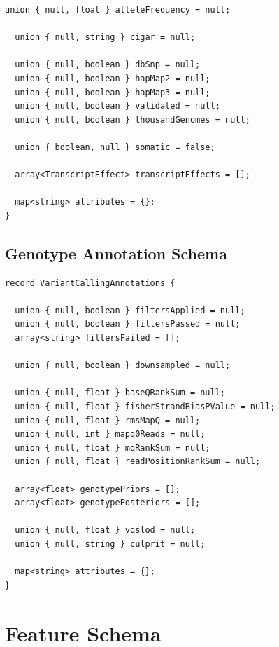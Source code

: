 \documentclass[phd]{ucbthesis}
\begin{document}
\begin{lstlisting}[caption={ADAM} variant annotation schemas]
  union { null, float } alleleFrequency = null;

  union { null, string } cigar = null;

  union { null, boolean } dbSnp = null;
  union { null, boolean } hapMap2 = null;
  union { null, boolean } hapMap3 = null;
  union { null, boolean } validated = null;
  union { null, boolean } thousandGenomes = null;

  union { boolean, null } somatic = false;

  array<TranscriptEffect> transcriptEffects = [];

  map<string> attributes = {};
}
\end{lstlisting}

\subsection{Genotype Annotation Schema}
\label{sec:genotype-annotation-schema}

\begin{lstlisting}[caption={ADAM} genotype annotation schema]
record VariantCallingAnnotations {

  union { null, boolean } filtersApplied = null;
  union { null, boolean } filtersPassed = null;
  array<string> filtersFailed = [];

  union { null, boolean } downsampled = null;

  union { null, float } baseQRankSum = null;
  union { null, float } fisherStrandBiasPValue = null;
  union { null, float } rmsMapQ = null;
  union { null, int } mapq0Reads = null;
  union { null, float } mqRankSum = null;
  union { null, float } readPositionRankSum = null;

  array<float> genotypePriors = [];
  array<float> genotypePosteriors = [];

  union { null, float } vqslod = null;
  union { null, string } culprit = null;

  map<string> attributes = {};
}
\end{lstlisting}

\section{Feature Schema}
\label{sec:feature-schema}
\end{document}
